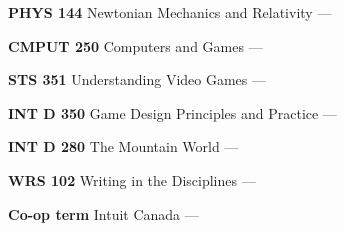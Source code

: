 \begin{cventries}
{\begin{multicols}{2}
\begin{cvitems}
          \vspace{0.5mm}
        \item {\textbf{PHYS 144} Newtonian Mechanics and Relativity --- }
          \vspace{1.5mm}
        \item {\textbf{CMPUT 250} Computers and Games --- }
          \vspace{0.5mm}
        \item {\textbf{STS 351} Understanding Video Games --- }
          \vspace{0.5mm}
        \item {\textbf{INT D 350} Game Design Principles and Practice --- }
          \vspace{1.5mm}
        \item {\textbf{INT D 280} The Mountain World --- }
          \vspace{0.5mm}
        \item {\textbf{WRS 102} Writing in the Disciplines --- }
          \vspace{1.5mm}
        \item {\textbf{Co-op term} Intuit Canada --- }
          \vspace{1.5mm}
      \end{cvitems}
    \end{multicols}
    }
  \end{cventries}
